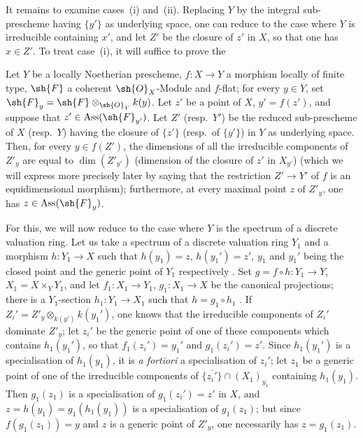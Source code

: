 \begin{env}[12.1.1.4]
\label{IV.12.1.1.4}
It remains to examine cases~(i) and~(ii).
Replacing $Y$ by the integral sub-prescheme having $\{y'\}$ as underlying space, one can reduce to the case where $Y$ is irreducible
containing $x'$, and let $Z'$ be the closure of $z'$ in $X$, so that one has $x\in Z'$.
To treat case~(i), it will suffice to prove the

\begin{proposition}[12.1.1.5]
\label{IV.12.1.1.5}
Let $Y$ be a locally Noetherian prescheme, $f:X\to Y$ a morphism locally of finite type, $\sh{F}$ a coherent $\sh{O}_X$-Module and $f$-flat; for every $y\in Y$, set $\sh{F}_y=\sh{F}\otimes_{\sh{O}_Y}k(y)$.
Let $z'$ be a point of $X$, $y'=f(z')$, and suppose that $z'\in\operatorname{Ass}(\sh{F}_{y'})$.
Let $Z'$ \textnormal{(}resp.\ $Y'$\textnormal{)} be the reduced sub-prescheme of $X$ \textnormal{(}resp.\ $Y$\textnormal{)} having the closure of $\{z'\}$ \textnormal{(}resp.\ of $\{y'\}$\textnormal{)} in $Y$ as underlying space.
Then, for every $y\in f(Z')$, the dimensions of all the irreducible components of $Z'_y$ are equal to $\dim(Z'_{y'})$ \textnormal{(}dimension of the closure of $z'$ in $X_{y'}$\textnormal{)} \textnormal{(}which we will express more precisely later  by saying that the restriction $Z'\to Y'$ of $f$ is an equidimensional morphism\textnormal{)}; furthermore, at every maximal point $z$ of $Z'_y$, one has $z\in\operatorname{Ass}(\sh{F}_y)$.
\end{proposition}

For this, we will now reduce to the case where $Y$ is the spectrum of a discrete valuation ring.
Let us take a spectrum of a discrete valuation ring $Y_1$ and a morphism $h:Y_1\to X$ such that $h(y_1)=z$, $h(y_1')=z'$, $y_1$ and $y_1'$ being the closed point and the generic point of $Y_1$ respectively .
Set $g=f\circ h:Y_1\to Y$, $X_1=X\times_Y Y_1$, and let $f_1:X_1\to Y_1$, $g_1:X_1\to X$ be the canonical projections; there is a $Y_1$-section $h_1:Y_1\to X_1$ such that $h=g_1\circ h_1$ .
If $Z_i'=Z'_y\otimes_{k(y')}k(y_1')$, one knows  that the irreducible components of $Z_i'$ dominate $Z'_y$; let $z_i'$ be the generic point of one of these components which contains $h_1(y_1')$, so that $f_1(z_i')=y_1'$ and $g_1(z_i')=z'$.
Since $h_1(y_1')$ is a specialisation of $h_1(y_1)$, it is \emph{a fortiori} a specialisation of $z_i'$; let $z_1$ be a generic point of one of the irreducible components of $\overline{\{z_i'\}}\cap(X_1)_{y_1}$ containing $h_1(y_1)$.
Then $g_1(z_1)$ is a specialisation of $g_1(z_i')=z'$ in $X$, and $z=h(y_1)=g_1(h_1(y_1))$ is a specialisation of $g_1(z_1)$; but since $f(g_1(z_1))=y$ and $z$ is a generic point of $Z'_y$, one necessarily has $z=g_1(z_1)$.


\end{env}
